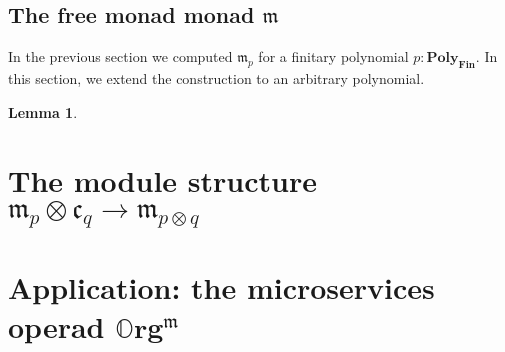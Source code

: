 \documentclass[11pt, one side, article]{memoir}
\theoremstyle{definition}
\theoremstyle{plain}
\newtheorem{lemma}[definitionx]{Lemma}
\newcommand{\Cat}[1]{\mathbf{#1}}%
\newcommand{\finset}{\Cat{Fin}}
\newcommand{\oorg}{\mathbb{O}\Cat{rg}}
\newcommand{\polyfin}{\poly_{\finset}}
\newcommand{\poly}{\Cat{Poly}}
\newcommand{\free}{\mathfrak{m}}
\newcommand{\cofree}{\mathfrak{c}}
\begin{document}
\section{The free monad monad $\free$}

In the previous section we computed $\free_p$ for a finitary polynomial $p:\polyfin$. In this section, we extend the construction to an arbitrary polynomial.

\begin{lemma}

\end{lemma}

\chapter{The module structure $\free_p\otimes\cofree_q\to\free_{p\otimes q}$}

\chapter{Application: the microservices operad $\oorg^\free$}

\printbibliography
\end{document}
